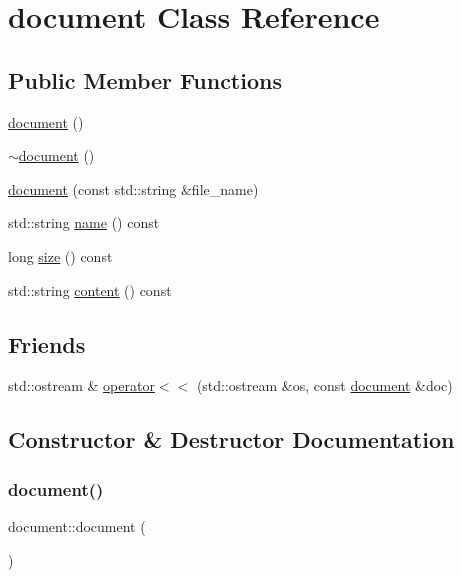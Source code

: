 \hypertarget{classdocument}{}\section{document Class Reference}
\label{classdocument}
\subsection*{Public Member Functions}
\begin{DoxyCompactItemize}
\item 
\hyperlink{classdocument_af1a85718219b8da6f1befaac0bf87989}{document} ()
\item 
\hyperlink{classdocument_afff6a78ede7767d8cbc0cb4566ae64da}{$\sim$document} ()
\item 
\hyperlink{classdocument_a750ac91b3537c59d0fff8e4a01085c98}{document} (const std\+::string \&file\+\_\+name)
\item 
std\+::string \hyperlink{classdocument_adb574ffbe92dcb3b2ba2eb134257a091}{name} () const
\item 
long \hyperlink{classdocument_aee0dba5f11baeb3b7da786bdd320a576}{size} () const
\item 
std\+::string \hyperlink{classdocument_a1f8943b94ad98c7b7c4b6fbec6370f66}{content} () const
\end{DoxyCompactItemize}
\subsection*{Friends}
\begin{DoxyCompactItemize}
\item 
std\+::ostream \& \hyperlink{classdocument_af474a7f5ba29bca5df031898e86a8687}{operator$<$$<$} (std\+::ostream \&os, const \hyperlink{classdocument}{document} \&doc)
\end{DoxyCompactItemize}


\subsection{Constructor \& Destructor Documentation}
\mbox{\label{classdocument_af1a85718219b8da6f1befaac0bf87989}} 
\subsubsection{\texorpdfstring{document()}{document()}\hspace{0.1cm}{\footnotesize\ttfamily [1/2]}}
{\footnotesize\ttfamily document\+::document (\begin{DoxyParamCaption}{ }\end{DoxyParamCaption})}

